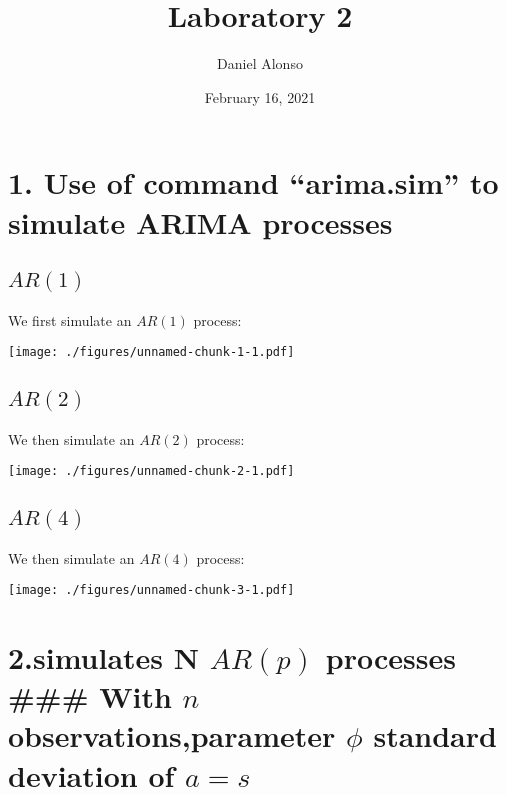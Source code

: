 \documentclass[]{article}
\title{Laboratory 2}
\author{Daniel Alonso}
\date{February 16, 2021}
\begin{document}
\maketitle

\hypertarget{use-of-command-arima.sim-to-simulate-arima-processes}{%
\section{1. Use of command ``arima.sim'' to simulate ARIMA
processes}\label{use-of-command-arima.sim-to-simulate-arima-processes}}

\hypertarget{ar1}{%
\subsection{\texorpdfstring{\(AR(1)\)}{AR(1)}}\label{ar1}}

We first simulate an \(AR(1)\) process:

\texttt{[image: ./figures/unnamed-chunk-1-1.pdf]}

\hypertarget{ar2}{%
\subsection{\texorpdfstring{\(AR(2)\)}{AR(2)}}\label{ar2}}

We then simulate an \(AR(2)\) process:

\texttt{[image: ./figures/unnamed-chunk-2-1.pdf]}

\hypertarget{ar4}{%
\subsection{\texorpdfstring{\(AR(4)\)}{AR(4)}}\label{ar4}}

We then simulate an \(AR(4)\) process:

\texttt{[image: ./figures/unnamed-chunk-3-1.pdf]}

\hypertarget{simulates-n-arp-processes-with-n-observationsparameter-phi-standard-deviation-of-a-s}{%
\section{\texorpdfstring{2.simulates N \(AR(p)\) processes \#\#\# With
\(n\) observations,parameter \(\phi\) standard deviation of
\(a = s\)}{2.simulates N AR(p) processes \#\#\# With n observations,parameter \textbackslash{}phi standard deviation of a = s}}\label{simulates-n-arp-processes-with-n-observationsparameter-phi-standard-deviation-of-a-s}}
\end{document}
